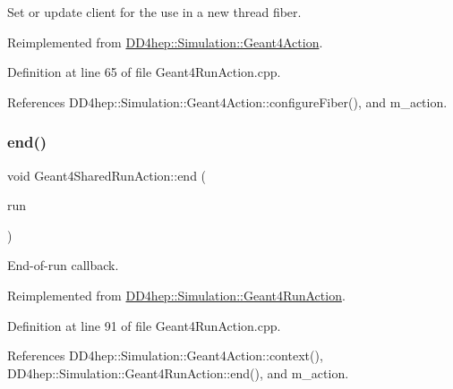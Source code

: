 Set or update client for the use in a new thread fiber. 



Reimplemented from \hyperlink{class_d_d4hep_1_1_simulation_1_1_geant4_action_a6adc7138508303e4e417cb48a737ab19}{D\+D4hep\+::\+Simulation\+::\+Geant4\+Action}.



Definition at line 65 of file Geant4\+Run\+Action.\+cpp.



References D\+D4hep\+::\+Simulation\+::\+Geant4\+Action\+::configure\+Fiber(), and m\+\_\+action.

\hypertarget{class_d_d4hep_1_1_simulation_1_1_geant4_shared_run_action_af723af818fd7798e910dcfef30092345}{}\label{class_d_d4hep_1_1_simulation_1_1_geant4_shared_run_action_af723af818fd7798e910dcfef30092345} 
\subsubsection{\texorpdfstring{end()}{end()}}
{\footnotesize\ttfamily void Geant4\+Shared\+Run\+Action\+::end (\begin{DoxyParamCaption}\item[{const G4\+Run $\ast$}]{run }\end{DoxyParamCaption})\hspace{0.3cm}{\ttfamily [virtual]}}



End-\/of-\/run callback. 



Reimplemented from \hyperlink{class_d_d4hep_1_1_simulation_1_1_geant4_run_action_a71c7dbfb3451a9d6cc594f0174a631a2}{D\+D4hep\+::\+Simulation\+::\+Geant4\+Run\+Action}.



Definition at line 91 of file Geant4\+Run\+Action.\+cpp.



References D\+D4hep\+::\+Simulation\+::\+Geant4\+Action\+::context(), D\+D4hep\+::\+Simulation\+::\+Geant4\+Run\+Action\+::end(), and m\+\_\+action.

\hypertarget{class_d_d4hep_1_1_simulation_1_1_geant4_shared_run_action_ae0502a99bbdefd87e3b32e5046294585}{}\label{class_d_d4hep_1_1_simulation_1_1_geant4_shared_run_action_ae0502a99bbdefd87e3b32e5046294585} 
